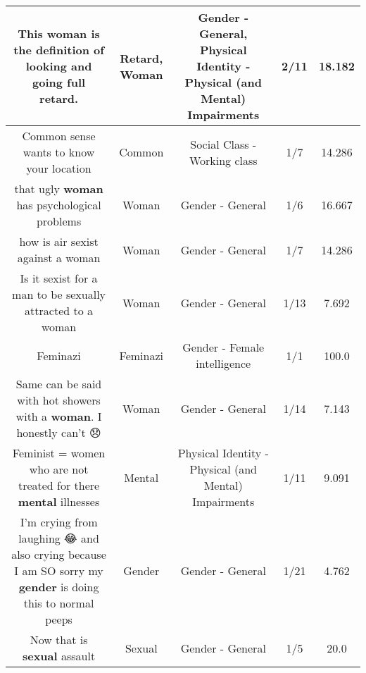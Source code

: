 \documentclass[11pt]{article}
\newlength\mylength
\begin{document}
\begin{center}
\begin{longtable}{|C{.65\mylength}|C{.30\mylength}|C{.12\mylength}|C{.12\mylength}|C{.12\mylength}|}
  \small This \textbf{woman} is the definition of looking and going full \textbf{retard}.\normalsize   & Retard, Woman & Gender - General, Physical Identity - Physical (and Mental) Impairments & 2/11 & 18.182 \\  \hline
  \small Common sense wants to know your location\normalsize   & Common & Social Class - Working class & 1/7 & 14.286 \\  \hline
  \small that ugly  \textbf{woman} has psychological problems\normalsize   & Woman & Gender - General & 1/6 & 16.667 \\  \hline
  \small how is air sexist against a woman\normalsize   & Woman & Gender - General & 1/7 & 14.286 \\  \hline
  \small Is it sexist for a man to be sexually attracted to a woman\normalsize   & Woman & Gender - General & 1/13 & 7.692 \\  \hline
  \small Feminazi\normalsize   & Feminazi & Gender - Female intelligence & 1/1 & 100.0 \\  \hline
  \small Same can be said with hot showers with a \textbf{woman}. I honestly can't 😞\normalsize   & Woman & Gender - General & 1/14 & 7.143 \\  \hline
  \small Feminist = women who are not treated for there \textbf{mental} illnesses\normalsize   & Mental & Physical Identity - Physical (and Mental) Impairments & 1/11 & 9.091 \\  \hline
  \small I'm crying from laughing 😂 and also crying because I am SO sorry my \textbf{gender} is doing this to normal peeps\normalsize   & Gender & Gender - General & 1/21 & 4.762 \\  \hline
  \small Now that is \textbf{sexual} assault\normalsize   & Sexual & Gender - General & 1/5 & 20.0 \\  \hline

\end{longtable}
\end{center}
\end{document}
